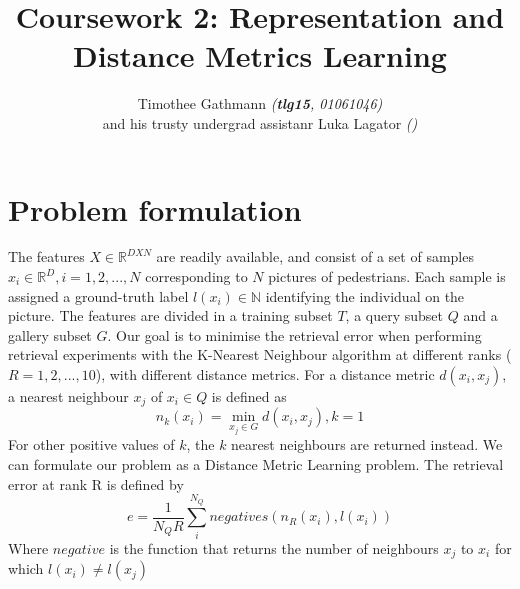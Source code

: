 \documentclass[10pt,technote]{IEEEtran}
\title{Coursework 2: Representation and Distance Metrics Learning }
\author{Timothee Gathmann \textit{(\textbf{tlg15}, 01061046)}\\ and his trusty undergrad assistanr Luka Lagator\textit{ ()}}
\begin{document}
\maketitle

\section{Problem formulation}
The features $X \in \mathbb{R}^{D X N}$ are readily available, and consist of a set of samples $x_i \in \mathbb{R}^D, i = 1, 2, ..., N$ corresponding to $N$ pictures of pedestrians. Each sample is assigned a ground-truth label $l(x_i) \in \mathbb{N}$ identifying the individual on the picture. The features are divided in a training subset $T$, a query subset $Q$ and a gallery subset $G$. Our goal is to minimise the retrieval error when performing retrieval experiments with the K-Nearest Neighbour algorithm \cite{Cover1967} at different ranks ($R = 1, 2, ..., 10 $), with different distance metrics. For a distance metric $d(x_i, x_j)$, a nearest neighbour $x_j$ of $x_i \in Q$ is defined as
\begin{equation}
n_k(x_i) = \min_{x_j \in G}  d(x_i, x_j), k = 1
\end{equation}
For other positive values of $k$, the $k$ nearest neighbours are returned instead.
We can formulate our problem as a Distance Metric Learning problem. The retrieval error at rank R is defined by
\begin{equation}
e = \frac{1}{N_Q R}\sum^{N_Q}_{i} negatives(n_R(x_i), l(x_i)) 
\end{equation}
Where $negative$ is the function that returns the number of neighbours $x_j$ to $x_i$ for which $l(x_i) \neq l(x_j)$






\end{document}
